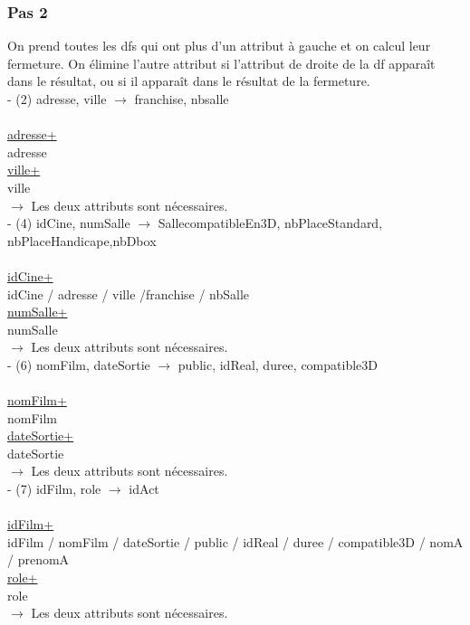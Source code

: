 \documentclass[a4paper,sffamily,12pt]{article}
\begin{document}
				\vspace{0.5cm}
									
			\subsubsection{Pas 2}

				\vspace{0.5cm}
	
				On prend toutes les dfs qui ont plus d'un attribut à gauche et on calcul leur fermeture. On élimine l'autre attribut si l'attribut de droite de la df apparaît dans le résultat, ou si il apparaît dans le résultat de la fermeture. \\
				
				\noindent - (2) adresse, ville $\rightarrow$ franchise, nbsalle \\
					\\
					\underline{adresse+} \\
					adresse \\
					\underline{ville+} \\
					ville \\
				$\rightarrow$ Les deux attributs sont nécessaires. \\

				\noindent - (4) idCine, numSalle $\rightarrow$ SallecompatibleEn3D, nbPlaceStandard, nbPlaceHandicape,nbDbox \\
					\\
					\underline{idCine+} \\
					idCine / adresse / ville /franchise / nbSalle \\
					\underline{numSalle+} \\
					numSalle \\
				$\rightarrow$ Les deux attributs sont nécessaires. \\
				
				\noindent - (6) nomFilm, dateSortie $\rightarrow$ public, idReal, duree, compatible3D \\																						\\
					\underline{nomFilm+} \\
					nomFilm \\
					\underline{dateSortie+} \\
					dateSortie \\
				$\rightarrow$ Les deux attributs sont nécessaires. \\
			
				\noindent - (7) idFilm, role $\rightarrow$  idAct \\
					\\
					\underline{idFilm+} \\
					idFilm / nomFilm / dateSortie / public / idReal / duree / compatible3D / nomA / prenomA \\
					\underline{role+} \\
					role \\
				$\rightarrow$ Les deux attributs sont nécessaires. \\
					
\end{document}
